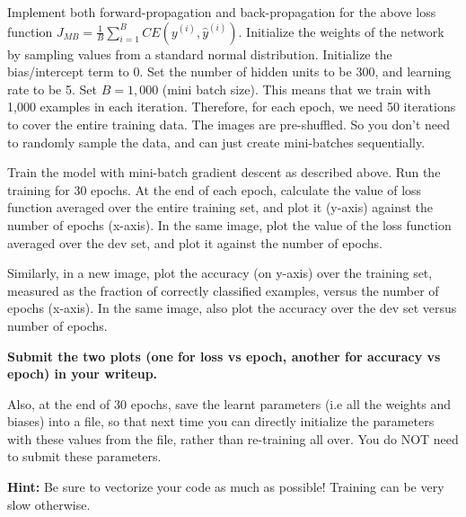 \item {} 
\label{subsec:mnist_02} 
Implement both forward-propagation and back-propagation for the above loss function $J_{MB} = \frac{1}{B}\sum_{i=1}^{B}CE(y^{(i)}, \hat{y}^{(i)})$.
Initialize the weights of the network by sampling values from a standard normal
distribution. Initialize the bias/intercept term to 0.
Set the number of hidden units to be 300, and learning rate to be 5. Set $B = 1,000$
(mini batch size). This means that we train with 1,000 examples in each iteration.
Therefore, for each epoch, we need 50 iterations to cover the entire training data.
The images are pre-shuffled. So you don't need to randomly sample the data, and can
just create mini-batches sequentially.


Train the model with mini-batch gradient descent
as described above. Run the training for 30 epochs. At the end of each epoch, calculate
the value of loss function averaged over the entire training set, and plot it
(y-axis) against the number of epochs (x-axis). In the same image, plot the value
of the loss function averaged over the dev set, and plot it against the number of epochs.

Similarly, in a new image, plot the accuracy (on y-axis) over the training set,
measured as the fraction of correctly classified examples, versus the number of epochs
(x-axis). In the same image, also plot the accuracy over the dev set versus number of epochs.

\textbf{Submit the two plots (one for loss vs epoch, another for accuracy vs epoch) in your writeup.}

Also, at the end of 30 epochs, save the learnt parameters (i.e all the weights and biases)
into a file, so that next time you can directly initialize the parameters with
these values from the file, rather than re-training all over. You do NOT need to
submit these parameters.


\textbf{Hint:} Be sure to vectorize your code as much as possible! Training can be
very slow otherwise.
